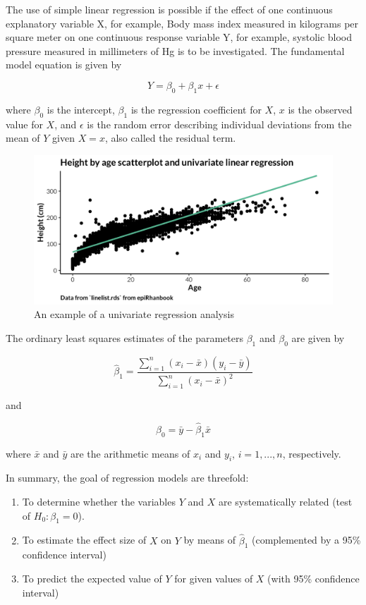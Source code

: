 \documentclass[
]{book}
\providecommand{\tightlist}{%
  \setlength{\itemsep}{0pt}\setlength{\parskip}{0pt}}
\begin{document}
The use of simple linear regression is possible if the effect of one continuous explanatory variable X, for example, Body mass index measured in kilograms per square meter on one continuous response variable Y, for example, systolic blood pressure measured in millimeters of Hg is to be investigated. The fundamental model equation is given by

\[
Y = \beta_0 + \beta_1x + \epsilon
\]

where \(\beta_0\) is the intercept, \(\beta_1\) is the regression coefficient for \(X\), \(x\) is the observed value for \(X\), and \(\epsilon\) is the random error describing individual deviations from the mean of \(Y\) given \(X=x\), also called the residual term.

\begin{figure}

{\centering \includegraphics[width=1\linewidth]{img/regression/univariate_regression} 

}

\caption{An example of a univariate regression analysis}\label{fig:unnamed-chunk-25}
\end{figure}

The ordinary least squares estimates of the parameters \(\beta_1\) and \(\beta_0\) are given by

\[
\hat{\beta}_1 = \frac{\sum_{i=1}^{n} (x_i-\bar{x})(y_i-\bar{y})}{\sum_{i=1}^{n} (x_i-\bar{x})^2}
\]

and

\[
\beta_0 = \bar{y}-\hat{\beta}_1\bar{x}
\]

where \(\bar{x}\) and \(\bar{y}\) are the arithmetic means of \(x_i\) and \(y_i\), \(i=1,...,n\), respectively.

In summary, the goal of regression models are threefold:

\begin{enumerate}
\def\labelenumi{\arabic{enumi}.}
\tightlist
\item
  To determine whether the variables \(Y\) and \(X\) are systematically related (test of \(H_0:\beta_1=0\)).
\item
  To estimate the effect size of \(X\) on \(Y\) by means of \(\hat{\beta}_1\) (complemented by a 95\% confidence interval)
\item
  To predict the expected value of \(Y\) for given values of \(X\) (with 95\% confidence interval)
\end{enumerate}
\end{document}
